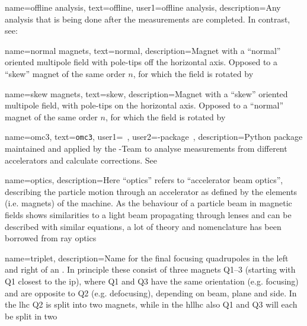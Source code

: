 {
        name={offline analysis},
        text=offline,
        user1={offline analysis},
        description={Any analysis that is being done after the measurements are completed.
        In contrast, see: }
}

{
        name={normal magnets},
        text=normal,
        description={Magnet with a ``normal'' oriented multipole field with pole-tips off the horizontal axis. 
        Opposed to a ``\gls{skew}'' magnet of the same order $n$, for which the field is rotated by }%
}

{
        name={skew magnets},
        text=skew,
        description={Magnet with a ``skew'' oriented multipole field, with pole-tips on the horizontal axis. 
        Opposed to a ``\gls{normal}'' magnet of the same order $n$, for which the field is rotated by }%
}

{
        name={omc3},
        text={\texttt{omc3}},
        user1={\glstext{\glslabel}~\cite{CODE:OMC:omc3}},
        user2={\glstext{\glslabel}-package~\cite{CODE:OMC:omc3}},
        description={Python package maintained and applied by the -Team to analyse 
        measurements from different accelerators and calculate corrections. See~\cite{CODE:OMC:omc3}}
}

{
        name={optics},
        description={Here ``optics'' refers to ``accelerator \gls{beam} optics'',
        describing the particle motion through an accelerator as defined by the elements
        (i.e. magnets) of the machine. As the behaviour of a particle \gls{beam} in magnetic fields shows 
        similarities to a light beam propagating through lenses and can be described with similar equations,
         a lot of theory and nomenclature has been borrowed from ray optics%
        }
}

{
        name=triplet,
        description={Name for the final focusing quadrupoles in the 
         left and right of an .
        In principle these consist of three magnets Q1--3 (starting with Q1 closest to the 
        \acrshort{ip}), where Q1 and Q3 have the same orientation (e.g. focusing) and are opposite
        to Q2 (e.g. defocusing), depending on \gls{beam}, plane and side.
        In the \acrfull{lhc} Q2 is split into two magnets, 
        while in the \acrfull{hllhc} also Q1 and Q3 will each be split in two%
        }
}

